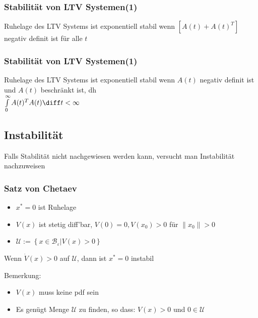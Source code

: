 \documentclass[german]{latex4ei/latex4ei_sheet}
\begin{document}
\begin{sectionbox}
\subsubsection{Stabilität von LTV Systemen(1)}
Ruhelage des LTV Systems ist exponentiell stabil wenn $\left[ A(t) + A(t)^T \right]$ negativ definit ist für alle $t$

\subsubsection{Stabilität von LTV Systemen(1)}
Ruhelage des LTV Systems ist exponentiell stabil wenn $A(t)$ negativ definit ist und $A(t)$ beschränkt ist, dh \\
$\int\limits_{0}^{\infty}A(t)^T A(t) \diff t < \infty$

\subsection{Instabilität}
Falls Stabilität nicht nachgewiesen werden kann, versucht man Instabilität nachzuweisen

\subsubsection{Satz von Chetaev}
\begin{itemize}
  \item $x^* = 0$ ist Ruhelage
  \item $V(x)$ ist stetig diff'bar, $V(0)=0, V(x_0)>0$ für $\|x_0\| > 0$
  \item $\mathcal{U} := \left\{ x \in \mathcal{B}_\varepsilon | V(x) > 0 \right\}$
\end{itemize}
Wenn $\dot{V}(x) > 0$ auf $\mathcal{U}$, dann ist $x^*=0$ instabil

Bemerkung:\\
\begin{itemize}
  \item $V(x)$ muss keine pdf sein
  \item Es genügt Menge $\mathcal{U}$ zu finden, so dass: $V(x) > 0$ und $0 \in \mathcal{U}$
\end{itemize}
\end{sectionbox}
\end{document}
